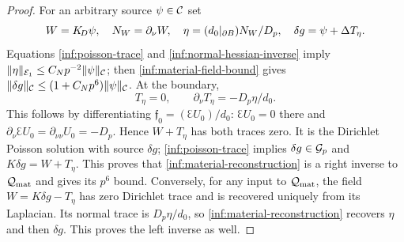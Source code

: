 \begin{proof}
For an arbitrary source $\psi\in\mathcal C$ set
\begin{equation}\label{inf:material-reconstruction}
 W=K_{\!D}\psi,\quad N_W=\partial_\nu W,\quad
 \eta=(d_0|_{\partial B})N_W/D_p,\quad
 \delta g=\psi+\Delta T_\eta.
\end{equation}
Equations \eqref{inf:poisson-trace} and
\eqref{inf:normal-hessian-inverse} imply
$\lVert \eta\rVert_{\mathcal E_1}\le C_Np^{-2}\lVert \psi\rVert_\mathcal C$;
then \eqref{inf:material-field-bound} gives
$\lVert \delta g\rVert_\mathcal C\le(1+C_Np^6)\lVert \psi\rVert_\mathcal C$.
At the boundary,
\[
 T_\eta=0,\qquad \partial_\nu T_\eta=-D_p\eta/d_0.
\]
This follows by differentiating $\mathfrak f_0=(\Euler U_0)/d_0$:
$\Euler U_0=0$ there and
$\partial_\nu\Euler U_0=\partial_{\nu\nu}U_0=-D_p$.
Hence $W+T_\eta$ has both traces zero.
It is the Dirichlet Poisson solution with source $\delta g$;
\eqref{inf:poisson-trace} implies $\delta g\in\mathcal{G}_p$ and
$K\delta g=W+T_\eta$.
This proves that \eqref{inf:material-reconstruction} is a right
inverse to $\mathcal Q_{\mathrm{mat}}$ and gives its $p^6$ bound.
Conversely, for any input to $\mathcal Q_{\mathrm{mat}}$, the field
$W=K\delta g-T_\eta$ has zero Dirichlet trace and is recovered
uniquely from its Laplacian. Its normal trace is $D_p\eta/d_0$,
so \eqref{inf:material-reconstruction} recovers $\eta$ and then
$\delta g$. This proves the left inverse as well.


\end{proof}
